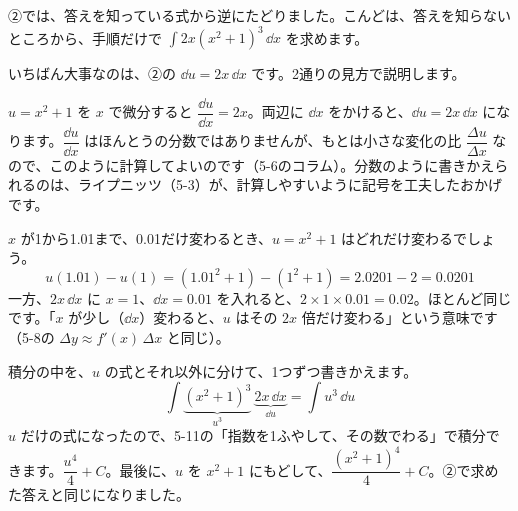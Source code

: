 \label{bk:5-16:chikan}②では、答えを知っている式から逆にたどりました。こんどは、答えを知らないところから、手順だけで $\displaystyle\int2x(x^2+1)^3\,\dd x$ を求めます。
\begin{bkcenter}
\end{bkcenter}
いちばん大事なのは、②の $\dd u=2x\,\dd x$ です。2通りの見方で説明します。

$u=x^2+1$ を $x$ で微分すると $\dfrac{\dd u}{\dd x}=2x$。両辺に $\dd x$ をかけると、$\dd u=2x\,\dd x$ になります。$\dfrac{\dd u}{\dd x}$ はほんとうの分数ではありませんが、もとは小さな変化の比 $\dfrac{\Delta u}{\Delta x}$ なので、このように計算してよいのです（5-6のコラム）。分数のように書きかえられるのは、ライプニッツ（5-3）が、計算しやすいように記号を工夫したおかげです。

$x$ が1から1.01まで、0.01だけ変わるとき、$u=x^2+1$ はどれだけ変わるでしょう。
\[ u(1.01)-u(1)=(1.01^2+1)-(1^2+1)=2.0201-2=0.0201 \]
一方、$2x\,\dd x$ に $x=1$、$\dd x=0.01$ を入れると、$2\times1\times0.01=0.02$。ほとんど同じです。「$x$ が少し（$\dd x$）変わると、$u$ はその $2x$ 倍だけ変わる」という意味です（5-8の $\Delta y\approx f'(x)\,\Delta x$ と同じ）。

積分の中を、$u$ の式とそれ以外に分けて、1つずつ書きかえます。
\[ \int\underbrace{(x^2+1)^3}_{u^3}\ \underbrace{2x\,\dd x}_{\dd u}=\int u^3\,\dd u \]
$u$ だけの式になったので、5-11の「指数を1ふやして、その数でわる」で積分できます。$\dfrac{u^4}{4}+C$。最後に、$u$ を $x^2+1$ にもどして、$\dfrac{(x^2+1)^4}{4}+C$。②で求めた答えと同じになりました。

